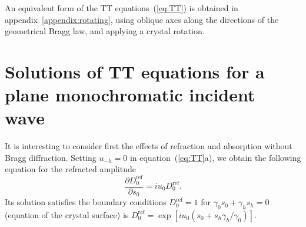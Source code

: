 \documentclass[preprint]{iucr}              %
\begin{document}
An equivalent form of the TT equations~(\ref{eq:TT}) is obtained in appendix~\ref{appendix:rotating}, using oblique axes along the directions of the geometrical Bragg law, and applying a crystal rotation.



%
\section{Solutions of TT equations  for a plane monochromatic incident wave}
\label{sec:TTsolutions}

It is interesting to consider first the effects of refraction and absorption without Bragg diffraction. 
Setting $u_{-h}=0$ in equation~(\ref{eq:TT}a), we obtain the following equation for the refracted amplitude 
\begin{equation}\label{eq:refraction}
\frac{\partial D_0^{\text{ref}}}{\partial s_0} = i u_0 D_0^{\text{ref}}.
\end{equation}
Its solution satisfies the boundary conditions $D_0^{\text{ref}}=1$ for  $\gamma_0 s_0 + \gamma_h s_h =0$ (equation of the crystal surface) is $D_0^{\text{ref}}= \exp[i u_0 (s_0 + s_h \gamma_h/\gamma_0)]$.
\end{document}
